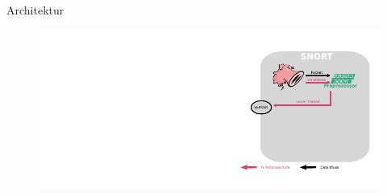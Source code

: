 \begin{frame}{Architektur}
    \begin{figure}
    	\centering
    	\includegraphics[width=\textwidth]{./images/arch/4.pdf}
    \end{figure}
\end{frame}

